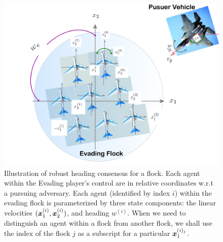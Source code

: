 \begin{figure}[tb!]
\centering
\includegraphics[width=\columnwidth]{figures/flock_pursuer.jpg}
\caption{Illustration of robust heading consensus for a flock. Each agent within the Evading player's control are in relative coordinates w.r.t a pursuing adversary. Each agent (identified by index $i$) within the evading flock is parameterized by three state components: the linear velocities $(\bm{x}_1^{(i)}, \bm{x}_2^{(i)})$, and heading $w^{(i)}$. When we need to distinguish an agent within a flock from another flock, we shall use the index of the flock \eg $j$ as a subscript for a particular \eg  $\bm{x}_1^{(i)_j}$.}
\label{fig:robust_heading}
\end{figure}

